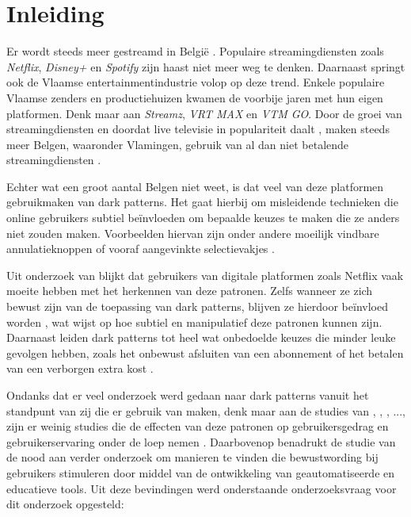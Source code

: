 \section{Inleiding}%
\label{sec:inleiding}

Er wordt steeds meer gestreamd in België \autocite{BNA2025}. Populaire streamingdiensten zoals \emph{Netflix}, \emph{Disney+} en \emph{Spotify} zijn haast niet meer weg te denken. Daarnaast springt ook de Vlaamse entertainmentindustrie volop op deze trend. Enkele populaire Vlaamse zenders en productiehuizen kwamen de voorbije jaren met hun eigen platformen. Denk maar aan \emph{Streamz}, \emph{VRT MAX} en \emph{VTM GO}. Door de groei van streamingdiensten en doordat live televisie in populariteit daalt \autocite{Digimeter2024}, maken steeds meer Belgen, waaronder Vlamingen, gebruik van al dan niet betalende streamingdiensten \autocite{BNA2025}. 

\vspace{1em}

Echter wat een groot aantal Belgen niet weet, is dat veel van deze platformen gebruikmaken van dark patterns. Het gaat hierbij om misleidende technieken die online gebruikers subtiel beïnvloeden om bepaalde keuzes te maken die ze anders niet zouden maken. Voorbeelden hiervan zijn onder andere moeilijk vindbare annulatieknoppen of vooraf aangevinkte selectievakjes \autocite{FODEconomie2024}. 

\vspace{1em}

Uit onderzoek van \textcite{BongardBlanchy2021} blijkt dat gebruikers van digitale platformen zoals Netflix vaak moeite hebben met het herkennen van deze patronen. Zelfs wanneer ze zich bewust zijn van de toepassing van dark patterns, blijven ze hierdoor beïnvloed worden \autocite{BongardBlanchy2021}, wat wijst op hoe subtiel en manipulatief deze patronen kunnen zijn. Daarnaast leiden dark patterns tot heel wat onbedoelde keuzes die minder leuke gevolgen hebben, zoals het onbewust afsluiten van een abonnement of het betalen van een verborgen extra kost \autocite{FODEconomie2024}.

\vspace{1em}

Ondanks dat er veel onderzoek werd gedaan naar dark patterns vanuit het standpunt van zij die er gebruik van maken, denk maar aan de studies van \textcite{Kitkowska2023}, \textcite{Kollmer2022}, \textcite{Gunawan2021}, \textcite{OECD2022}..., zijn er weinig studies die de effecten van deze patronen op gebruikersgedrag en gebruikerservaring onder de loep nemen \autocite{BongardBlanchy2021}. Daarbovenop benadrukt de studie van \textcite{DiGeronimo2020} de nood aan verder onderzoek om manieren te vinden die bewustwording bij gebruikers stimuleren door middel van de ontwikkeling van geautomatiseerde en educatieve tools. Uit deze bevindingen werd onderstaande onderzoeksvraag voor dit onderzoek opgesteld:


